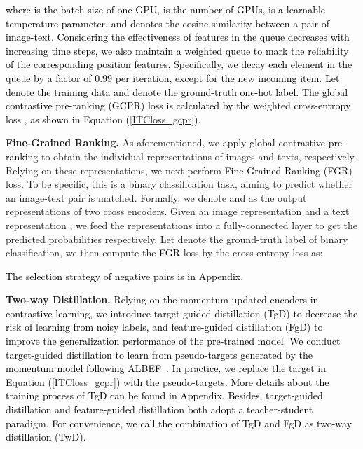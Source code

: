 \documentclass[sigconf]{acmart}
\def\ljc{\textcolor{black}}
\def\blue{\textcolor{black}}
\def\mmxie{\textcolor{black}}
\def\mmljc{\textcolor{black}}
\def\mmcr{\textcolor{black}}
\begin{document}
\ljc{where  is the batch size of one GPU,  is the number of GPUs,  is a learnable temperature parameter, and  denotes the cosine similarity between a pair of image-text.}
\mmxie{Considering the effectiveness of features in the queue decreases with increasing time steps, we also maintain a weighted queue  to mark the reliability of the corresponding position features. Specifically, we decay each element in the queue by a factor of 0.99 per iteration, except for the new incoming item. Let  denote the training data and  denote the ground-truth one-hot label. The \mmcr{global contrastive pre-ranking (GCPR)} loss is calculated by the weighted cross-entropy loss , as shown in Equation (\ref{ITCloss_gcpr}). }





\textbf{Fine-Grained Ranking.}
As aforementioned, we apply \mmcr{global contrastive pre-ranking} to obtain the individual representations of images and texts, respectively. Relying on these representations, we next perform \mmcr{Fine-Grained Ranking (FGR)} loss. To be specific, this is a binary classification task, aiming to predict whether an image-text pair is matched.
Formally, we denote  and  as the output representations of two cross encoders.
Given an image representation  and a text representation , 
we feed the representations into a fully-connected layer  to get the predicted probabilities respectively. Let  denote the ground-truth label of binary classification, we then compute the \mmcr{FGR} loss by the cross-entropy loss  as:


\blue{The selection strategy of negative pairs is in Appendix.}




\textbf{Two-way Distillation.}
\mmljc{Relying on the momentum-updated encoders in contrastive learning, we introduce target-guided distillation (TgD) to decrease the risk of learning from noisy labels, and feature-guided distillation (FgD) to improve the generalization performance of the pre-trained model. We conduct target-guided distillation to learn from pseudo-targets generated by the momentum model following ALBEF~\cite{ALBEF}. In practice, we replace the target in Equation (\ref{ITCloss_gcpr}) with the pseudo-targets. \mmcr{More details about the training process of TgD can be found in Appendix.}
Besides, target-guided distillation and feature-guided distillation both adopt a teacher-student paradigm.}
\mmljc{For convenience, we call the combination of TgD and FgD as two-way distillation (TwD). }
\end{document}
